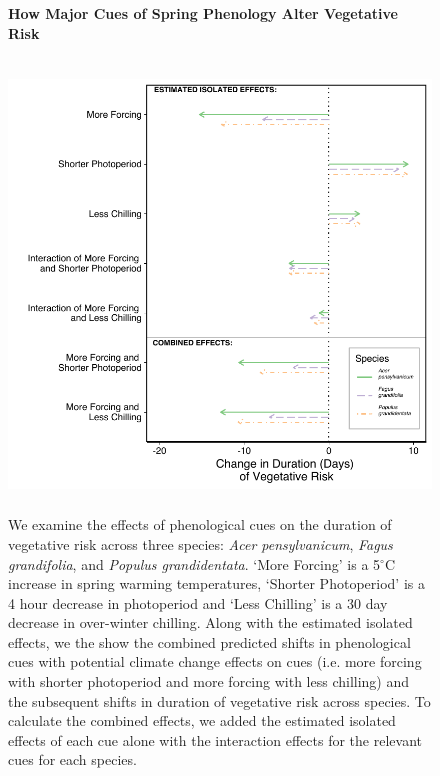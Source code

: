 \documentclass{article}\usepackage[]{graphicx}\usepackage[]{color}
\begin{document}
\begin{figure} [H] 
 \begin{center}
 \textbf{How Major Cues of Spring Phenology Alter Vegetative Risk}\par\medskip
 \includegraphics[width=12cm, height=12cm]{..//figure/Exp_plotTPS.pdf} 
 \caption{We examine the effects of phenological cues on the duration of vegetative risk across three species: \textit{Acer pensylvanicum}, \textit{Fagus grandifolia}, and \textit{Populus grandidentata}. `More Forcing' is a 5$^{\circ}$C increase in spring warming temperatures, `Shorter Photoperiod' is a 4 hour decrease in photoperiod and `Less Chilling' is a 30 day decrease in over-winter chilling. Along with the estimated isolated effects, we the show the combined predicted shifts in phenological cues with potential climate change effects on cues (i.e. more forcing with shorter photoperiod and more forcing with less chilling) and the subsequent shifts in duration of vegetative risk across species. To calculate the combined effects, we added the estimated isolated effects of each cue alone with the interaction effects for the relevant cues for each species. }\label{fig:dan} 
 \end{center}
 \end{figure}
\end{document}
